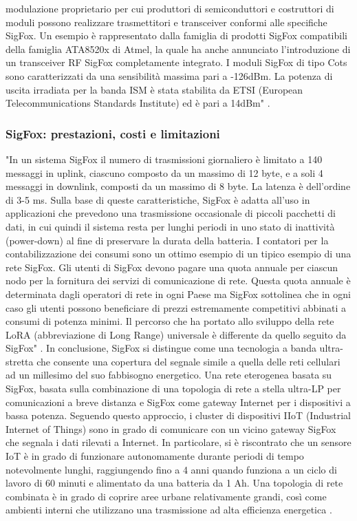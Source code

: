 \documentclass[a4paper]{report} %
\begin{document}
modulazione proprietario per cui produttori di semiconduttori e costruttori di moduli possono realizzare trasmettitori e transceiver conformi alle specifiche SigFox. Un esempio è rappresentato dalla famiglia di prodotti SigFox compatibili della famiglia ATA8520x di Atmel, la quale ha anche annunciato l'introduzione di un transceiver RF SigFox completamente integrato. I moduli SigFox di tipo Cots sono caratterizzati da una sensibilità massima pari a -126dBm. La potenza di uscita irradiata per la banda ISM è stata stabilita da ETSI (European Telecommunications Standards Institute) ed è pari a 14dBm" \cite{art:rif.23}.

\subsubsection{SigFox: prestazioni, costi e limitazioni}
"In un sistema SigFox il numero di trasmissioni giornaliero è limitato a 140 messaggi in uplink, ciascuno composto da un massimo di 12 byte, e a soli 4 messaggi in downlink, composti da un massimo di 8 byte. La latenza è dell'ordine di 3-5 ms. Sulla base di queste caratteristiche, SigFox è adatta all'uso in applicazioni che prevedono una trasmissione occasionale di piccoli pacchetti di dati, in cui quindi il sistema resta per lunghi periodi in uno stato di inattività (power-down) al fine di preservare la durata della batteria. I contatori per la contabilizzazione dei consumi sono un ottimo esempio di un tipico esempio di una rete SigFox. Gli utenti di SigFox devono pagare una quota annuale per ciascun nodo per la fornitura dei servizi di comunicazione di rete. Questa quota annuale è determinata dagli operatori di rete in ogni Paese ma SigFox sottolinea che in ogni caso gli utenti possono beneficiare di prezzi estremamente competitivi abbinati a consumi di potenza minimi. Il percorso che ha portato allo sviluppo della rete LoRA (abbreviazione di Long Range) universale è differente da quello seguito da SigFox" \cite{art:rif.23}.
In conclusione, SigFox si distingue come una tecnologia a banda ultra-stretta che consente una copertura del segnale simile a quella delle reti cellulari ad un millesimo del suo fabbisogno energetico. Una rete eterogenea basata su SigFox, basata sulla combinazione di una topologia di rete a stella ultra-LP per comunicazioni a breve distanza e SigFox come gateway Internet per i dispositivi a bassa potenza. Seguendo questo approccio, i cluster di dispositivi IIoT (Industrial Internet of Things) sono in grado di comunicare con un vicino gateway SigFox che segnala i dati rilevati a Internet. In particolare, si è riscontrato che un sensore IoT è in grado di funzionare autonomamente durante periodi di tempo notevolmente lunghi, raggiungendo fino a 4 anni quando funziona a un ciclo di lavoro di 60 minuti e alimentato da una batteria da 1 Ah. Una topologia di rete combinata è in grado di coprire aree urbane relativamente grandi, così come ambienti interni che utilizzano una trasmissione ad alta efficienza energetica \cite{art:rif.42}. 
\end{document}
